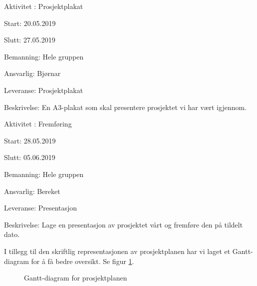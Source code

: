 \documentclass[11pt,a4paper]{report}
\begin{document}
\begin{compactdesc}
	
	\item [Aktivitet \arabic{aktivitetTeller}:] Prosjektplakat
	\begin{compactitem}
	\item Start: 20.05.2019
	\item Slutt: 27.05.2019
	\item Bemanning: Hele gruppen
	\item Ansvarlig: Bjørnar
	\item Leveranse: Prosjektplakat
	\item Beskrivelse: En A3-plakat som skal presentere prosjektet vi har vært igjennom.
	\addtocounter{aktivitetTeller}{1}
	\end{compactitem}
	
	\item [Aktivitet \arabic{aktivitetTeller}:] Fremføring
	\begin{compactitem}
	\item Start: 28.05.2019
	\item Slutt: 05.06.2019
	\item Bemanning: Hele gruppen
	\item Ansvarlig: Bereket
	\item Leveranse: Presentasjon
	\item Beskrivelse: Lage en presentasjon av prosjektet vårt og fremføre den på tildelt dato. 
	\addtocounter{aktivitetTeller}{1}
	\end{compactitem}
\end{compactdesc}



I tillegg til den skriftlig representasjonen av prosjektplanen har vi laget et Gantt-diagram for å få bedre oversikt. Se figur \ref{fig:gantt-diagram}.

\begin{figure}[H]
    \centering
    \caption{Gantt-diagram for prosjektplanen}
    \label{fig:gantt-diagram}
\end{figure}
\end{document}
